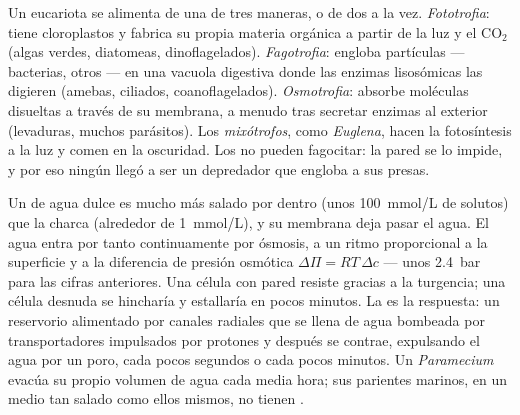 \begin{definition}\label{def:b2:unicellular-diversity:nutrition}
Un eucariota  se alimenta de una de tres maneras, o de dos a la
vez. \emph{Fototrofia}: tiene cloroplastos y fabrica su propia materia
orgánica a partir de la luz y el $\mathrm{CO_2}$ (algas verdes, diatomeas,
dinoflagelados). \emph{Fagotrofia}: engloba partículas --- bacterias,
otros  --- en una vacuola digestiva donde las enzimas
lisosómicas las digieren (amebas, ciliados, coanoflagelados).
\emph{Osmotrofia}: absorbe moléculas disueltas a través de su membrana, a
menudo tras secretar enzimas al exterior (levaduras, muchos parásitos).
Los \emph{mixótrofos}, como \emph{Euglena}, hacen la fotosíntesis a la
luz y comen en la oscuridad. Los  no pueden fagocitar: la
pared se lo impide, y por eso ningún  llegó a ser un
depredador que engloba a sus presas.
\end{definition}

\begin{proposition}\label{prop:b2:unicellular-diversity:osmoregulation}
Un  de agua dulce es mucho más salado por dentro (unos
\qty{100}{mmol/L} de solutos) que la charca (alrededor de
\qty{1}{mmol/L}), y su membrana deja pasar el agua. El agua entra por
tanto continuamente por ósmosis, a un ritmo proporcional a la superficie
y a la diferencia de presión osmótica $\Delta\Pi = RT\,\Delta c$ ---
unos \qty{2.4}{bar} para las cifras anteriores. Una célula con pared
resiste gracias a la turgencia; una célula desnuda se hincharía y
estallaría en pocos minutos. La \emph{} es la
respuesta: un reservorio alimentado por canales radiales que se llena
de agua bombeada por transportadores impulsados por protones y después se
contrae, expulsando el agua por un poro, cada pocos segundos o cada pocos
minutos. Un \emph{Paramecium} evacúa su propio volumen de agua cada media
hora; sus parientes marinos, en un medio tan salado como ellos mismos,
no tienen .
\end{proposition}

